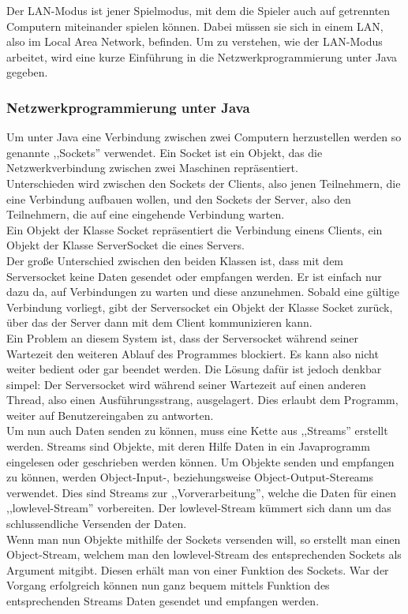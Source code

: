 \documentclass[12pt,a4paper]{article}
\begin{document}
Der LAN-Modus ist jener Spielmodus, mit dem die Spieler auch auf getrennten Computern miteinander spielen können. Dabei müssen sie sich in einem LAN, also im Local Area Network, befinden. Um zu verstehen, wie der LAN-Modus arbeitet, wird eine kurze Einführung in die Netzwerkprogrammierung unter Java gegeben. 

\subsubsection{Netzwerkprogrammierung unter Java}

Um unter Java eine Verbindung zwischen zwei Computern herzustellen werden so genannte ,,Sockets'' verwendet. Ein Socket ist ein Objekt, das die Netzwerkverbindung zwischen zwei Maschinen repräsentiert.\\
Unterschieden wird zwischen den Sockets der Clients, also jenen Teilnehmern, die eine Verbindung aufbauen wollen, und den Sockets der Server, also den Teilnehmern, die auf eine eingehende Verbindung warten.\\
Ein Objekt der Klasse Socket repräsentiert die Verbindung einens Clients, ein Objekt der Klasse ServerSocket die eines Servers.\\
Der große Unterschied zwischen den beiden Klassen ist, dass mit dem Serversocket keine Daten gesendet oder empfangen werden. Er ist einfach nur dazu da, auf  Verbindungen zu warten und diese anzunehmen. Sobald eine gültige Verbindung vorliegt, gibt der Serversocket ein Objekt der Klasse Socket zurück, über das der Server dann mit dem Client kommunizieren kann.\\[2ex]
Ein Problem an diesem System ist, dass der Serversocket während seiner Wartezeit den weiteren Ablauf des Programmes blockiert. Es kann also nicht weiter bedient oder gar beendet werden. Die Lösung dafür ist jedoch denkbar simpel: Der Serversocket wird während seiner Wartezeit auf einen anderen Thread, also einen Ausführungsstrang, ausgelagert. Dies erlaubt dem Programm, weiter auf Benutzereingaben zu antworten.\\[3ex]
Um nun auch Daten senden zu können, muss eine Kette aus ,,Streams'' erstellt werden. Streams sind Objekte, mit deren Hilfe Daten in ein Javaprogramm eingelesen oder geschrieben werden können. 
Um Objekte senden und empfangen zu können, werden Object-Input-, beziehungsweise Object-Output-Stereams verwendet. Dies sind Streams zur ,,Vorverarbeitung'', welche die Daten für einen ,,lowlevel-Stream'' vorbereiten. Der lowlevel-Stream kümmert sich dann um das schlussendliche Versenden der Daten. \\[2ex]
Wenn man nun Objekte mithilfe der Sockets versenden will, so erstellt man einen Object-Stream, welchem man den lowlevel-Stream des entsprechenden Sockets als Argument mitgibt. Diesen erhält man von einer Funktion des Sockets. War der Vorgang erfolgreich können nun ganz bequem mittels Funktion des entsprechenden Streams Daten gesendet und empfangen werden.
\end{document}
